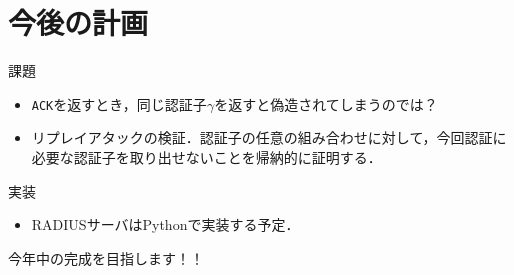 \section{今後の計画}
\toc
\begin{frame}{\fft}
    \begin{alertblock}{課題}
        \begin{itemize}
            \item \texttt{ACK}を返すとき，同じ認証子\(\gamma\)を返すと偽造されてしまうのでは？
            \item リプレイアタックの検証．認証子の任意の組み合わせに対して，今回認証に必要な認証子を取り出せないことを帰納的に証明する．
        \end{itemize}
    \end{alertblock}
    \vfill
    \begin{exampleblock}{実装}
        \begin{itemize}
            \item RADIUSサーバはPythonで実装する予定．
        \end{itemize}
    \end{exampleblock}
    \hfill 今年中の完成を目指します！！
\end{frame}
